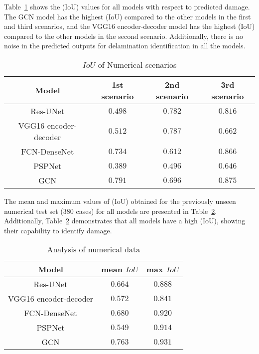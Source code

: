 Table~\ref{tab:table_numerical_scenarios} shows the (IoU) values for all models with respect to predicted damage.
The GCN model has the highest (IoU) compared to the other models in the first and third scenarios, and the VGG16 encoder-decoder model has the highest (IoU) compared to the other models in the second scenario.
Additionally, there is no noise in the predicted outputs for delamination identification in all the models.
\begin{table}[]
	\centering
	\caption{\(IoU\) of Numerical scenarios}
	\label{tab:table_numerical_scenarios}
	\resizebox{\textwidth}{!}
	{
		\begin{tabular}{cccc}\hline
			Model & 1st scenario & 2nd scenario & 3rd scenario \\ \hline
			Res-UNet & \(0.498\) & \(0.782\) & \(0.816\) \\ 
			VGG16 encoder-decoder & \(0.512\) & \(0.787\) & \(0.662\) \\
			FCN-DenseNet & \(0.734\) & \(0.612\) & \(0.866\) \\ 
			PSPNet & \(0.389\) & \(0.496\) & \(0.646\) \\ 
			GCN & \(0.791\) & \(0.696\) & \(0.875\) \\ \hline
		\end{tabular}
	}
\end{table}

The mean and maximum values of (IoU) obtained for the previously unseen numerical test set (380 cases) for all models are presented in Table~\ref{tab:table_iou}.
Additionally, Table~\ref{tab:table_iou} demonstrates that all models have a high (IoU), showing their capability to identify damage.
\begin{table}[]
	\centering
	\caption{Analysis of numerical data}
	\label{tab:table_iou}
	\begin{tabular}{ccc}\hline
		Model & mean \(IoU\) & max \(IoU\) \\ \hline
		Res-UNet & \(0.664\) & \(0.888\) \\ 
		VGG16 encoder-decoder & \(0.572\) & \(0.841\) \\ 
		FCN-DenseNet & \(0.680\) & \(0.920\) \\ 
		PSPNet & \(0.549\) & \(0.914\) \\ 
		GCN & \(0.763\) & \(0.931\) \\ \hline
	\end{tabular}
\end{table}


